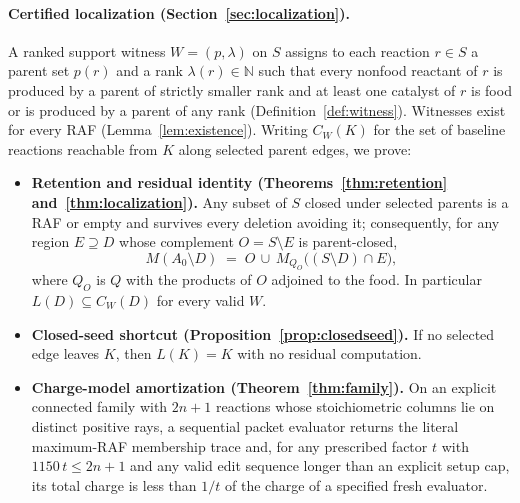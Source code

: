 \documentclass[11pt,a4paper]{article}
\theoremstyle{plain}
\theoremstyle{definition}
\theoremstyle{remark}
\newcommand{\N}{\mathbb{N}}
\begin{document}
\paragraph{Certified localization (Section~\ref{sec:localization}).}
A ranked support witness $W=(p,\lambda)$ on $S$ assigns to each reaction $r\in S$ a parent set $p(r)$ and a rank $\lambda(r)\in\N$ such that every nonfood reactant of $r$ is produced by a parent of strictly smaller rank and at least one catalyst of $r$ is food or is produced by a parent of any rank (Definition~\ref{def:witness}). Witnesses exist for every RAF (Lemma~\ref{lem:existence}). Writing $C_W(K)$ for the set of baseline reactions reachable from $K$ along selected parent edges, we prove:
\begin{itemize}
\item \textbf{Retention and residual identity (Theorems~\ref{thm:retention} and~\ref{thm:localization}).} Any subset of $S$ closed under selected parents is a RAF or empty and survives every deletion avoiding it; consequently, for any region $E\supseteq D$ whose complement $O=S\setminus E$ is parent-closed,
\[
M(A_0\setminus D)\;=\;O\,\cup\,M_{Q_O}\big((S\setminus D)\cap E\big),
\]
where $Q_O$ is $Q$ with the products of $O$ adjoined to the food. In particular $L(D)\subseteq C_W(D)$ for every valid $W$.
\item \textbf{Closed-seed shortcut (Proposition~\ref{prop:closedseed}).} If no selected edge leaves $K$, then $L(K)=K$ with no residual computation.
\item \textbf{Charge-model amortization (Theorem~\ref{thm:family}).} On an explicit connected family with $2n+1$ reactions whose stoichiometric columns lie on distinct positive rays, a sequential packet evaluator returns the literal maximum-RAF membership trace and, for any prescribed factor $t$ with $1150\,t\le 2n+1$ and any valid edit sequence longer than an explicit setup cap, its total charge is less than $1/t$ of the charge of a specified fresh evaluator.
\end{itemize}
\end{document}
